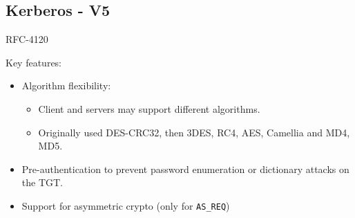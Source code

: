 \subsection{Kerberos - V5}
\begin{center}
    RFC-4120
\end{center}
Key features:
\begin{itemize}
    \item Algorithm flexibility:
    \begin{itemize}
        \item Client and servers may support different algorithms.
        \item Originally used DES-CRC32, then 3DES, RC4, AES, Camellia and MD4, MD5.
    \end{itemize}
    \item Pre-authentication to prevent password enumeration or dictionary attacks on the TGT.
    \item Support for asymmetric crypto (only for \texttt{AS\_REQ})
\end{itemize}


